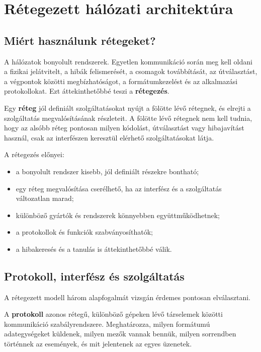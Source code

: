 

\section{Rétegezett hálózati architektúra}

\subsection{Miért használunk rétegeket?}

A hálózatok bonyolult rendszerek. Egyetlen kommunikáció során meg kell oldani a fizikai jelátvitelt, a hibák felismerését, a csomagok továbbítását, az útválasztást, a végpontok közötti megbízhatóságot, a formátumkezelést és az alkalmazási protokollokat. Ezt áttekinthetőbbé teszi a \textbf{rétegezés}.

Egy \textbf{réteg} jól definiált szolgáltatásokat nyújt a fölötte lévő rétegnek, és elrejti a szolgáltatás megvalósításának részleteit. A fölötte lévő rétegnek nem kell tudnia, hogy az alsóbb réteg pontosan milyen kódolást, útválasztást vagy hibajavítást használ, csak az interfészen keresztül elérhető szolgáltatásokat látja.

A rétegezés előnyei:

\begin{itemize}
  \item a bonyolult rendszer kisebb, jól definiált részekre bontható;
  \item egy réteg megvalósítása cserélhető, ha az interfész és a szolgáltatás változatlan marad;
  \item különböző gyártók és rendszerek könnyebben együttműködhetnek;
  \item a protokollok és funkciók szabványosíthatók;
  \item a hibakeresés és a tanulás is áttekinthetőbbé válik.
\end{itemize}



\subsection{Protokoll, interfész és szolgáltatás}

A rétegezett modell három alapfogalmát vizsgán érdemes pontosan elválasztani.

A \textbf{protokoll} azonos rétegű, különböző gépeken lévő társelemek közötti kommunikáció szabályrendszere. Meghatározza, milyen formátumú adategységeket küldenek, milyen mezők vannak bennük, milyen sorrendben történnek az események, és mit jelentenek az egyes üzenetek.

